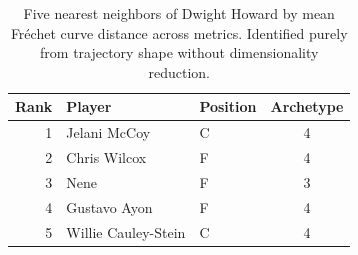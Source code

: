 \begin{table}[htbp]
  \centering\small
  \begin{tabular}{rllc}
    \toprule
    Rank & Player & Position & Archetype \\
    \midrule
    1 & Jelani McCoy & C & 4 \\
    2 & Chris Wilcox & F & 4 \\
    3 & Nene & F & 3 \\
    4 & Gustavo Ayon & F & 4 \\
    5 & Willie Cauley-Stein & C & 4 \\
    \bottomrule
  \end{tabular}
  \caption{Five nearest neighbors of Dwight Howard by mean Fr\'{e}chet curve distance across metrics. Identified purely from trajectory shape without dimensionality reduction.}
  \label{tab:Dwight_Howard_frechet_curve_neighbors}
\end{table}

